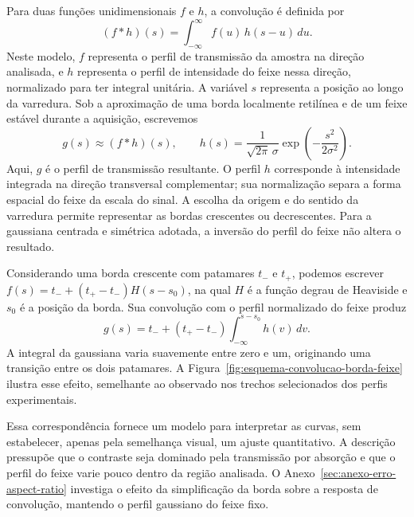 \documentclass[12pt,a4paper]{article}
\newcounter{anexo}
\begin{document}
Para duas funções unidimensionais $f$ e $h$, a convolução é definida por
\begin{equation}
    (f*h)(s)=\int_{-\infty}^{\infty} f(u)\,h(s-u)\,du.
    \label{eq:definicao-convolucao}
\end{equation}
Neste modelo, $f$ representa o perfil de transmissão da amostra na direção analisada, e $h$ representa o perfil de intensidade do feixe nessa direção, normalizado para ter integral unitária. A variável $s$ representa a posição ao longo da varredura. Sob a aproximação de uma borda localmente retilínea e de um feixe estável durante a aquisição, escrevemos
\begin{equation}
    g(s)\approx(f*h)(s),
    \qquad
    h(s)=\frac{1}{\sqrt{2\pi}\,\sigma}
    \exp\left(-\frac{s^2}{2\sigma^2}\right).
    \label{eq:modelo-convolucao-amostra-feixe}
\end{equation}
Aqui, $g$ é o perfil de transmissão resultante. O perfil $h$ corresponde à intensidade integrada na direção transversal complementar; sua normalização separa a forma espacial do feixe da escala do sinal. A escolha da origem e do sentido da varredura permite representar as bordas crescentes ou decrescentes. Para a gaussiana centrada e simétrica adotada, a inversão do perfil do feixe não altera o resultado.

Considerando uma borda crescente com patamares $t_-$ e $t_+$, podemos escrever $f(s)=t_-+(t_+-t_-)H(s-s_0)$, na qual $H$ é a função degrau de Heaviside e $s_0$ é a posição da borda. Sua convolução com o perfil normalizado do feixe produz
\begin{equation}
    g(s)=t_-+(t_+-t_-)\int_{-\infty}^{s-s_0}h(v)\,dv.
    \label{eq:convolucao-degrau-gaussiana}
\end{equation}
A integral da gaussiana varia suavemente entre zero e um, originando uma transição entre os dois patamares. A Figura~\ref{fig:esquema-convolucao-borda-feixe} ilustra esse efeito, semelhante ao observado nos trechos selecionados dos perfis experimentais.



Essa correspondência fornece um modelo para interpretar as curvas, sem estabelecer, apenas pela semelhança visual, um ajuste quantitativo. A descrição pressupõe que o contraste seja dominado pela transmissão por absorção e que o perfil do feixe varie pouco dentro da região analisada. O Anexo~\ref{sec:anexo-erro-aspect-ratio} investiga o efeito da simplificação da borda sobre a resposta de convolução, mantendo o perfil gaussiano do feixe fixo.
\end{document}
